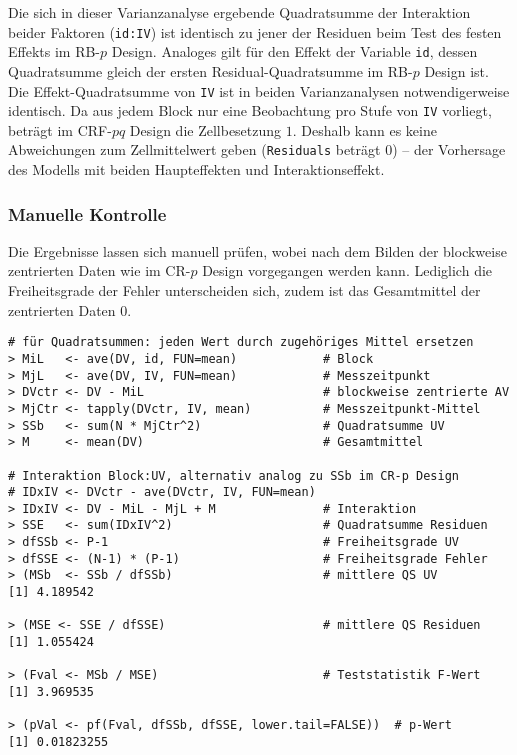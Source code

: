 Die sich in dieser Varianzanalyse ergebende Quadratsumme der Interaktion beider Faktoren (\lstinline!id:IV!) ist identisch zu jener der Residuen beim Test des festen Effekts im RB-$p$ Design. Analoges gilt für den Effekt der Variable \lstinline!id!, dessen Quadratsumme gleich der ersten Residual-Quadratsumme im RB-$p$ Design ist. Die Effekt-Quadratsumme von \lstinline!IV! ist in beiden Varianzanalysen notwendigerweise identisch. Da aus jedem Block nur eine Beobachtung pro Stufe von \lstinline!IV! vorliegt, beträgt im CRF-$pq$ Design die Zellbesetzung $1$. Deshalb kann es keine Abweichungen zum Zellmittelwert geben (\lstinline!Residuals! beträgt $0$) -- der Vorhersage des Modells mit beiden Haupteffekten und Interaktionseffekt.

\subsubsection{Manuelle Kontrolle}

Die Ergebnisse lassen sich manuell prüfen, wobei nach dem Bilden der blockweise zentrierten Daten wie im CR-$p$ Design vorgegangen werden kann. Lediglich die Freiheitsgrade der Fehler unterscheiden sich, zudem ist das Gesamtmittel der zentrierten Daten $0$.
\begin{lstlisting}
# für Quadratsummen: jeden Wert durch zugehöriges Mittel ersetzen
> MiL   <- ave(DV, id, FUN=mean)            # Block
> MjL   <- ave(DV, IV, FUN=mean)            # Messzeitpunkt
> DVctr <- DV - MiL                         # blockweise zentrierte AV
> MjCtr <- tapply(DVctr, IV, mean)          # Messzeitpunkt-Mittel
> SSb   <- sum(N * MjCtr^2)                 # Quadratsumme UV
> M     <- mean(DV)                         # Gesamtmittel

# Interaktion Block:UV, alternativ analog zu SSb im CR-p Design
# IDxIV <- DVctr - ave(DVctr, IV, FUN=mean)
> IDxIV <- DV - MiL - MjL + M               # Interaktion
> SSE   <- sum(IDxIV^2)                     # Quadratsumme Residuen
> dfSSb <- P-1                              # Freiheitsgrade UV
> dfSSE <- (N-1) * (P-1)                    # Freiheitsgrade Fehler
> (MSb  <- SSb / dfSSb)                     # mittlere QS UV
[1] 4.189542

> (MSE <- SSE / dfSSE)                      # mittlere QS Residuen
[1] 1.055424

> (Fval <- MSb / MSE)                       # Teststatistik F-Wert
[1] 3.969535

> (pVal <- pf(Fval, dfSSb, dfSSE, lower.tail=FALSE))  # p-Wert
[1] 0.01823255
\end{lstlisting}

